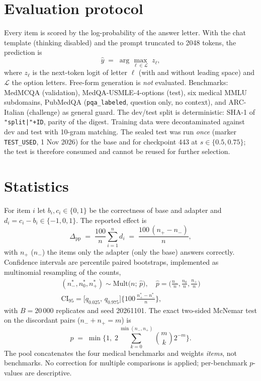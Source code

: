 \documentclass[11pt,a4paper]{article}
\begin{document}
\section{Evaluation protocol}
Every item is scored by the log-probability of the answer letter. With the chat template (thinking disabled) and the prompt truncated to 2048 tokens, the prediction is
\begin{equation}\label{eq:mc}
\hat y \;=\; \arg\max_{\ell\in\mathcal{L}} \; z_\ell ,
\end{equation}
where $z_\ell$ is the next-token logit of letter $\ell$ (with and without leading space) and $\mathcal{L}$ the option letters. Free-form generation is \emph{not} evaluated. Benchmarks: MedMCQA (validation), MedQA-USMLE-4-options (test), six medical MMLU subdomains, PubMedQA (\texttt{pqa\_labeled}, question only, no context), and ARC-Italian (challenge) as general guard. The dev/test split is deterministic: SHA-1 of \texttt{"split|"+ID}, parity of the digest. Training data were decontaminated against dev and test with 10-gram matching. The sealed test was run \emph{once} (marker \texttt{TEST\_USED}, 1 Nov 2026) for the base and for checkpoint 443 at $s\in\{0.5,0.75\}$; the test is therefore consumed and cannot be reused for further selection.

\section{Statistics}
For item $i$ let $b_i,c_i\in\{0,1\}$ be the correctness of base and adapter and $d_i=c_i-b_i\in\{-1,0,1\}$. The reported effect is
\begin{equation}\label{eq:delta}
\Delta_{\mathrm{pp}} \;=\; \frac{100}{n}\sum_{i=1}^{n} d_i \;=\; \frac{100\,(n_{+}-n_{-})}{n},
\end{equation}
with $n_+$ ($n_-$) the items only the adapter (only the base) answers correctly. Confidence intervals are percentile paired bootstraps, implemented as multinomial resampling of the counts,
\begin{equation}\label{eq:boot}
\begin{gathered}
(n_-^*,n_0^*,n_+^*)\sim\mathrm{Mult}\!\big(n;\,\hat p\big),\quad \hat p=\big(\tfrac{n_-}{n},\tfrac{n_0}{n},\tfrac{n_+}{n}\big)\\[3pt] \mathrm{CI}_{95}=\big[q_{0.025},\,q_{0.975}\big]\big\{100\,\tfrac{n_+^*-n_-^*}{n}\big\},
\end{gathered}\end{equation}
with $B=20\,000$ replicates and seed 20261101. The exact two-sided McNemar test on the discordant pairs ($n_-+n_+=m$) is
\begin{equation}\label{eq:mcn}
p \;=\; \min\Big\{1,\; 2\sum_{k=0}^{\min(n_-,n_+)}\binom{m}{k}2^{-m}\Big\}.
\end{equation}
The pool concatenates the four medical benchmarks and weights \emph{items}, not benchmarks. No correction for multiple comparisons is applied; per-benchmark $p$-values are descriptive.
\end{document}

